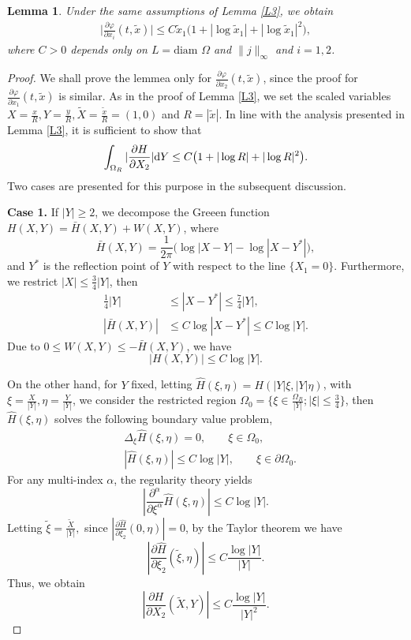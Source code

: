 \documentclass[11pt,reqno]{amsart}%
\newtheorem{Lemma}{Lemma}[section]
\theoremstyle{definition}
\theoremstyle{remark}
\begin{document}
\begin{Lemma}\label{L4}
Under the same assumptions of Lemma \ref{L3},
  we obtain
\begin{align}
\Big|\frac{\partial \varphi}{\partial x_{i}}(t,\tilde{x})\Big|\leq C\tilde{x}_{1}\big(1+|\log\tilde{x}_{1}|+|\log\tilde{x}_{1}|^{2}\big),\nonumber
\end{align}
where $C>0$ depends only on $L=\text{diam } \Omega$ and $\|j\|_{\infty}$ and $i=1,2$.
\end{Lemma}
\begin{proof}
We shall prove the lemmea only for  $\frac{\partial \varphi}{\partial x_{2}}(t,\tilde{x})$, since the proof for  $\frac{\partial \varphi}{\partial x_{1}}(t,\tilde{x})$ is similar.
%
As in the proof of Lemma \ref{L3}, we set the scaled variables $X=\frac{x}{R}, Y=\frac{y}{R}, \tilde{X}=\frac{\tilde{x}}{R}=(1,0)$ and $R=|\tilde{x}|$. In line with the analysis  presented in Lemma \ref{L3}, it is sufficient to show that
$$\int_{\Omega_{R}}|\frac{\partial H}{\partial X_{2}}|{\rm d}Y\leq C\big(1+|\log R|+|\log R|^{2}\big).$$
Two cases are presented for this purpose in the subsequent discussion.

{\bf Case 1.} If $|Y|\geq 2$, we decompose the Greeen function $H(X,Y)=\bar{H}(X,Y)+W(X,Y)$, where
$$\bar{H}(X,Y)=\frac{1}{2\pi}\big(\log|X-Y|-\log|X-Y^{*}|\big),$$
and $Y^{*}$ is the reflection point of $Y$ with respect to the line $\{X_{1}=0\}$.
Furthermore, we restrict $|X|\leq\frac{3}{4}|Y|$, then
\begin{align}
\frac{1}{4}|Y|&\leq |X-Y^{*}|\leq \frac{7}{4}|Y|, \nonumber\\
|\bar{H}(X,Y)|&\leq C\log |X-Y^{*}|\leq C\log |Y|.\nonumber
\end{align}
Due to $0\leq W(X,Y)\leq -\bar{H}(X,Y)$, we have
$$|H(X,Y)|\leq C\log|Y|.$$

On the other hand, for $Y$ fixed, letting $\hat{H}(\xi,\eta)=H(|Y|\xi,|Y|\eta)$, with $\xi=\frac{X}{|Y|},\eta=\frac{Y}{|Y|}$, we consider the restricted region
$\Omega_{0}=\{\xi\in \frac{\Omega_{R}}{|Y|}; |\xi|\leq\frac{3}{4}\}$, then $\hat{H}(\xi,\eta)$ solves the following boundary value problem,
\begin{align}
&\Delta_{\xi}\hat{H}(\xi,\eta)=0,\qquad \xi\in \Omega_{0},\nonumber\\
&|\hat{H}(\xi,\eta)|\leq C\log|Y|,\qquad  \xi\in \partial\Omega_{0}. \nonumber
\end{align}
For any multi-index $\alpha$, the regularity theory yields
$$|\frac{\partial^{\alpha}}{\partial\xi^{\alpha}}\hat{H}(\xi,\eta)|\leq C\log |Y|.$$
Letting $\tilde{\xi}=\frac{\tilde{X}}{|Y|},$ since $|\frac{\partial \hat{H}}{\partial \xi_{2}}(0,\eta)|=0$, by the Taylor theorem we have
$$|\frac{\partial \hat{H}}{\partial \xi_{2}}(\tilde{\xi},\eta)|\leq C\frac{\log |Y|}{|Y|}.$$
Thus, we obtain
$$|\frac{\partial H}{\partial X_{2}}(\tilde{X},Y)|\leq C\frac{\log |Y|}{|Y|^{2}}.$$


\end{proof}
\end{document}
